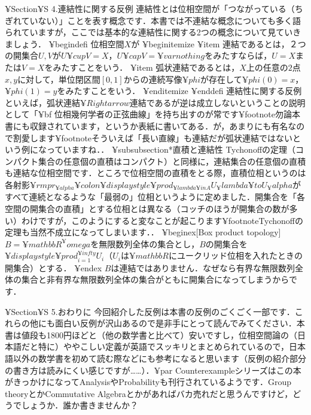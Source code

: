 ¥Section{¥S 4.連結性に関する反例}
連結性とは位相空間が「つながっている（ちぎれていない）」ことを表す概念です．本書では不連結な概念についても多く語られていますが，ここでは基本的な連結性に関する2つの概念について見ていきましょう．
¥begin{defi}
位相空間$X$が
¥begin{itemize}
¥item 連結であるとは，２つの開集合$U,V$が$U¥cup V=X$，$U¥cap V=¥varnothing$をみたすならば，$U=X$または$V=X$をみたすことをいう．
¥item 弧状連結であるとは，$X$上の任意の$2$点$x,y$に対して，単位閉区間$[0,1]$からの連続写像$¥phi$が存在して$¥phi (0)=x$，$¥phi (1)=y$をみたすことをいう．
¥end{itemize}
¥end{defi}
連結性に関する反例といえば，弧状連結$¥Rightarrow$連結であるが逆は成立しないということの説明として「{¥bf 位相幾何学者の正弦曲線}」を持ち出すのが常です¥footnote{勿論本書にも収録されています，というか表紙に書いてある．}が，あまりにも有名なので割愛します¥footnote{そういえば「長い直線」も連結だが弧状連結ではないという例になっていますね．}．
¥subsubsection*{直積と連結性}
Tychonoffの定理（コンパクト集合の任意個の直積はコンパクト）と同様に，連結集合の任意個の直積も連結な位相空間です．ところで位相空間の直積をとる際，直積位相というのは各射影$¥rm{pr_{¥alpha}}¥colon¥displaystyle ¥prod_{¥lambda¥in A} U_¥lambda¥to U_¥alpha$がすべて連続となるような「最弱の」位相というように定めました．開集合を「各空間の開集合の直積」とする位相とは異なる（コッチのほうが開集合の数が多い）わけですが，このようにすると変なことが起こります¥footnote{Tychonoffの定理も当然不成立になってしまいます．}．
¥begin{ex}[Box product topology]
$B=¥mathbb{R}^¥omega$を無限数列全体の集合とし，$B$の開集合を$¥displaystyle ¥prod_{i=1}^{¥infty} U_i$（$U_i$は$¥mathbb{R}$にユークリッド位相を入れたときの開集合）とする．
¥end{ex}
$B$は連結ではありません．なぜなら有界な無限数列全体の集合と非有界な無限数列全体の集合がともに開集合になってしまうからです．

¥Section{¥S 5.おわりに}
今回紹介した反例は本書の反例のごくごく一部です．これらの他にも面白い反例が沢山あるので是非手にとって読んでみてください．本書は値段も1800円ほどと（他の数学書と比べて）安いですし，位相空間論の（日本語だと特に）ややこしい定義が英語でスッキリとまとめられているので，日本語以外の数学書を初めて読む際などにも参考になると思います（反例の紹介部分の書き方は読みにくい感じですが……）．¥par
Counterexampleシリーズはこの本がきっかけになってAnalysisやProbabilityも刊行されているようです．Group theoryとかCommutative Algebraとかがあればバカ売れだと思うんですけど，どうでしょうか．誰か書きませんか？
